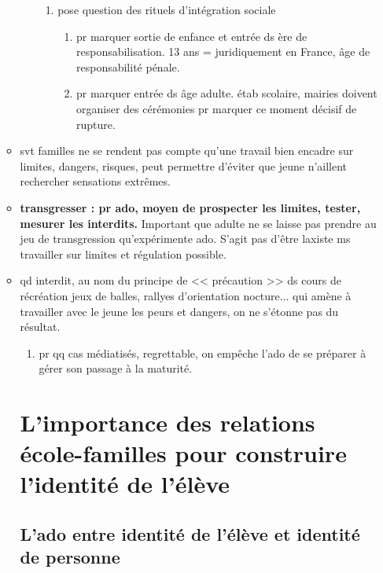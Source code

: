 \documentclass[12pt]{report}
\begin{document}
\begin{itemize}
\begin{itemize}
\begin{enumerate}
\begin{enumerate}
\item pose question des rituels d'intégration sociale
\begin{enumerate}
\item pr marquer sortie de enfance et entrée ds ère de responsabilisation. 13 ans = juridiquement en France, âge de responsabilité pénale.
\item pr marquer entrée ds âge adulte. étab scolaire, mairies doivent organiser des cérémonies pr marquer ce moment décisif de rupture.
\end{enumerate}
\end{enumerate}
\end{enumerate}

\item svt familles ne se rendent pas compte qu'une travail bien encadre sur limites, dangers, risques, peut permettre d'éviter que jeune n'aillent rechercher sensations extrêmes.\\
\item \textbf{transgresser : pr ado, moyen de prospecter les limites, tester, mesurer les interdits.} Important que adulte ne se laisse pas prendre au jeu de transgression qu'expérimente ado. S'agit pas d'être laxiste ms travailler sur limites et régulation possible.\\

\item qd interdit, au nom du principe de << précaution >> ds cours de récréation jeux de balles, rallyes d'orientation nocture... qui amène à travailler avec le jeune les peurs et dangers, on ne s'étonne pas du résultat.
\begin{enumerate}
\item pr qq cas médiatisés, regrettable, on empêche l'ado de se préparer à gérer son passage à la maturité.\\
\end{enumerate}


\section{L'importance des relations école-familles pour construire l'identité de l'élève}

\subsection{L'ado entre identité de l'élève et identité de personne}

\end{itemize}
\end{itemize}
\end{document}
